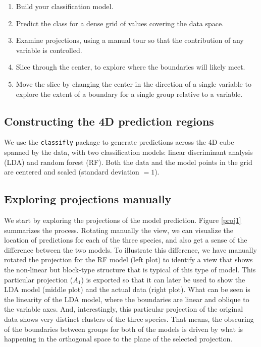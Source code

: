 \documentclass[]{interact}
\theoremstyle{plain}%
\theoremstyle{definition}
\theoremstyle{remark}
\providecommand{\tightlist}{%
  \setlength{\itemsep}{0pt}\setlength{\parskip}{0pt}}
\def\tightlist{}
\begin{document}
\begin{enumerate}
\def\labelenumi{\arabic{enumi}.}
\tightlist
\item
  Build your classification model.
\item
  Predict the class for a dense grid of values covering the data space.
\item
  Examine projections, using a manual tour so that the contribution of
  any variable is controlled.
\item
  Slice through the center, to explore where the boundaries will likely
  meet.
\item
  Move the slice by changing the center in the direction of a single
  variable to explore the extent of a boundary for a single group
  relative to a variable.
\end{enumerate}

\hypertarget{constructing-the-4d-prediction-regions}{%
\subsection{Constructing the 4D prediction
regions}\label{constructing-the-4d-prediction-regions}}

We use the \texttt{classifly} package \citep{classifly} to generate
predictions across the 4D cube spanned by the data, with two
classification models: linear discriminant analysis (LDA) and random
forest (RF). Both the data and the model points in the grid are centered
and scaled (standard deviation \(= 1\)).

\hypertarget{exploring-projections-manually}{%
\subsection{Exploring projections
manually}\label{exploring-projections-manually}}

We start by exploring the projections of the model prediction. Figure
\ref{proj1} summarizes the process. Rotating manually the view, we can
visualize the location of predictions for each of the three species, and
also get a sense of the difference between the two models. To illustrate
this difference, we have manually rotated the projection for the RF
model (left plot) to identify a view that shows the non-linear but
block-type structure that is typical of this type of model. This
particular projection (\(A_1\)) is exported so that it can later be used
to show the LDA model (middle plot) and the actual data (right plot).
What can be seen is the linearity of the LDA model, where the boundaries
are linear and oblique to the variable axes. And, interestingly, this
particular projection of the original data shows very distinct clusters
of the three species. That means, the obscuring of the boundaries
between groups for both of the models is driven by what is happening in
the orthogonal space to the plane of the selected projection.
\end{document}
